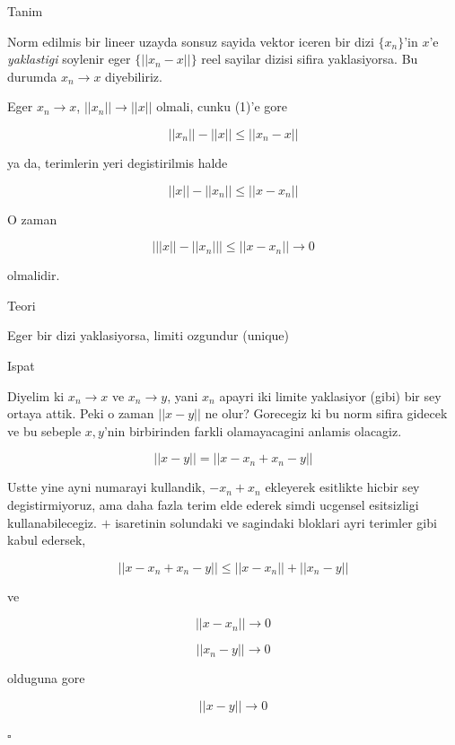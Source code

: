 \documentclass[12pt,fleqn]{article}\usepackage{../common}
\begin{document}
Tanim 

Norm edilmis bir lineer uzayda sonsuz sayida vektor iceren bir dizi
$\{x_n\}$'in $x$'e {\em yaklastigi} soylenir eger $\{||x_n-x||\}$ reel
sayilar dizisi sifira yaklasiyorsa. Bu durumda $x_n \to x$ diyebiliriz.

Eger $x_n \to x$, $||x_n|| \to ||x||$ olmali, cunku (1)'e gore 

\[ ||x_n||  - ||x|| \le ||x_n-x|| \]

ya da, terimlerin yeri degistirilmis halde

\[ ||x||  - ||x_n|| \le ||x-x_n|| \]

O zaman 

\[ \bigg| ||x||  - ||x_n|| \bigg|  \le ||x-x_n|| \to 0\]

olmalidir. 

Teori 

Eger bir dizi yaklasiyorsa, limiti ozgundur (unique)

Ispat

Diyelim ki $x_n \to x$ ve $x_n \to y$, yani $x_n$ apayri iki limite
yaklasiyor (gibi) bir sey ortaya attik. Peki o zaman $||x-y||$ ne olur?
Gorecegiz ki bu norm sifira gidecek ve bu sebeple $x,y$'nin birbirinden
farkli olamayacagini anlamis olacagiz. 

\[ ||x-y|| =  ||x-x_n + x_n-y|| \]

Ustte yine ayni numarayi kullandik, $-x_n+x_n$ ekleyerek esitlikte hicbir
sey degistirmiyoruz, ama daha fazla terim elde ederek simdi ucgensel
esitsizligi kullanabilecegiz. $+$ isaretinin solundaki ve sagindaki
bloklari ayri terimler gibi kabul edersek, 

\[ ||x-x_n + x_n-y|| \le ||x-x_n || + ||x_n-y|| \]

ve

\[ ||x-x_n || \to 0 \]

\[ ||x_n-y|| \to 0\]

olduguna gore 

\[ ||x-y|| \to 0 \]

$\square$
\end{document}
